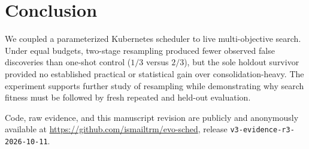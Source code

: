 \documentclass[conference]{IEEEtran}
\begin{document}
\balance
\section{Conclusion}
We coupled a parameterized Kubernetes scheduler to live multi-objective search. Under equal budgets, two-stage resampling produced fewer observed false discoveries than one-shot control ($1/3$ versus $2/3$), but the sole holdout survivor provided no established practical or statistical gain over consolidation-heavy. The experiment supports further study of resampling while demonstrating why search fitness must be followed by fresh repeated and held-out evaluation.

Code, raw evidence, and this manuscript revision are publicly and anonymously available at \url{https://github.com/ismailtrm/evo-sched}, release \texttt{v3-evidence-r3-2026-10-11}.
\end{document}
